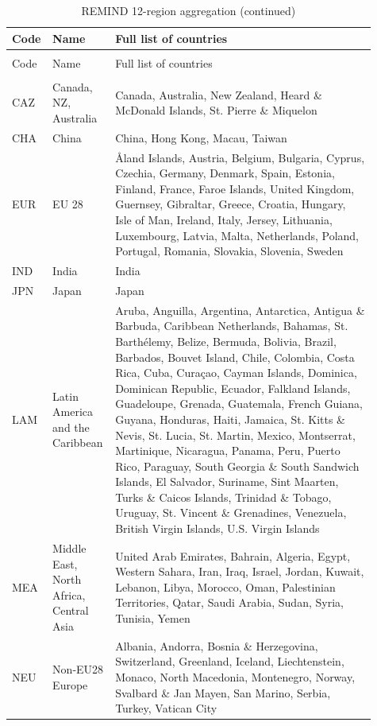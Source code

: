 \begin{longtable}{>{\raggedright\arraybackslash}p{0.06\linewidth}>{\raggedright\arraybackslash}p{0.15\linewidth}>{\raggedright\arraybackslash}p{0.7\linewidth}}
\caption{REMIND 12-region aggregation}\label{tab:regions_h12}\\
\toprule
Code & Name & Full list of countries \\
\midrule
\endfirsthead
\caption{REMIND 12-region aggregation (continued)}\\
\toprule
Code & Name & Full list of countries \\
\midrule
\endhead
\midrule
\multicolumn{2}{r}{Continued on next page} \\
\endfoot
\bottomrule
\endlastfoot
CAZ & Canada, NZ, Australia & Canada, Australia, New Zealand, Heard \& McDonald Islands, St. Pierre \& Miquelon \\
CHA & China & China, Hong Kong, Macau, Taiwan \\
EUR & EU 28 & Åland Islands, Austria, Belgium, Bulgaria, Cyprus, Czechia, Germany, Denmark, Spain, Estonia, Finland, France, Faroe Islands, United Kingdom, Guernsey, Gibraltar, Greece, Croatia, Hungary, Isle of Man, Ireland, Italy, Jersey, Lithuania, Luxembourg, Latvia, Malta, Netherlands, Poland, Portugal, Romania, Slovakia, Slovenia, Sweden \\
IND & India & India \\
JPN & Japan & Japan \\
LAM & Latin America and the Caribbean & Aruba, Anguilla, Argentina, Antarctica, Antigua \& Barbuda, Caribbean Netherlands, Bahamas, St. Barthélemy, Belize, Bermuda, Bolivia, Brazil, Barbados, Bouvet Island, Chile, Colombia, Costa Rica, Cuba, Curaçao, Cayman Islands, Dominica, Dominican Republic, Ecuador, Falkland Islands, Guadeloupe, Grenada, Guatemala, French Guiana, Guyana, Honduras, Haiti, Jamaica, St. Kitts \& Nevis, St. Lucia, St. Martin, Mexico, Montserrat, Martinique, Nicaragua, Panama, Peru, Puerto Rico, Paraguay, South Georgia \& South Sandwich Islands, El Salvador, Suriname, Sint Maarten, Turks \& Caicos Islands, Trinidad \& Tobago, Uruguay, St. Vincent \& Grenadines, Venezuela, British Virgin Islands, U.S. Virgin Islands \\
MEA & Middle East, North Africa, Central Asia & United Arab Emirates, Bahrain, Algeria, Egypt, Western Sahara, Iran, Iraq, Israel, Jordan, Kuwait, Lebanon, Libya, Morocco, Oman, Palestinian Territories, Qatar, Saudi Arabia, Sudan, Syria, Tunisia, Yemen \\
NEU & Non-EU28 Europe & Albania, Andorra, Bosnia \& Herzegovina, Switzerland, Greenland, Iceland, Liechtenstein, Monaco, North Macedonia, Montenegro, Norway, Svalbard \& Jan Mayen, San Marino, Serbia, Turkey, Vatican City \\

\end{longtable}
